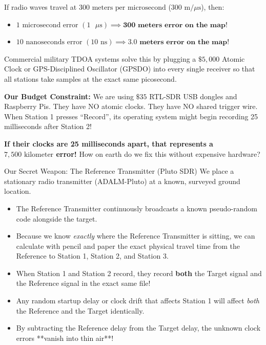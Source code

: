 \documentclass[11pt,a4paper]{article}
\begin{document}
If radio waves travel at $300\text{ meters per microsecond}$ ($300\text{ m/}\mu\text{s}$), then:
\begin{itemize}
    \item $1\text{ microsecond error } (1\text{ }\mu\text{s}) \implies \mathbf{300\text{ meters error on the map}}!$
    \item $10\text{ nanoseconds error } (10\text{ ns}) \implies \mathbf{3.0\text{ meters error on the map}}!$
\end{itemize}

Commercial military TDOA systems solve this by plugging a $\$5{,}000$ Atomic Clock or GPS-Disciplined Oscillator (GPSDO) into every single receiver so that all stations take samples at the exact same picosecond. 

\textbf{Our Budget Constraint:} We are using $\$35$ RTL-SDR USB dongles and Raspberry Pis. They have NO atomic clocks. They have NO shared trigger wire. When Station 1 presses ``Record'', its operating system might begin recording 25 milliseconds after Station 2! 

\textbf{If their clocks are 25 milliseconds apart, that represents a $7{,}500\text{ kilometer}$ error!} How on earth do we fix this without expensive hardware?

\begin{conceptbox}{Our Secret Weapon: The Reference Transmitter (Pluto SDR)}
We place a stationary radio transmitter (ADALM-Pluto) at a known, surveyed ground location.
\begin{itemize}[leftmargin=*]
    \item The Reference Transmitter continuously broadcasts a known pseudo-random code alongside the target.
    \item Because we know \textit{exactly} where the Reference Transmitter is sitting, we can calculate with pencil and paper the exact physical travel time from the Reference to Station 1, Station 2, and Station 3.
    \item When Station 1 and Station 2 record, they record \textbf{both} the Target signal and the Reference signal in the exact same file!
    \item Any random startup delay or clock drift that affects Station 1 will affect \textit{both} the Reference and the Target identically.
    \item By subtracting the Reference delay from the Target delay, the unknown clock errors **vanish into thin air**!
\end{itemize}
\end{conceptbox}
\end{document}
